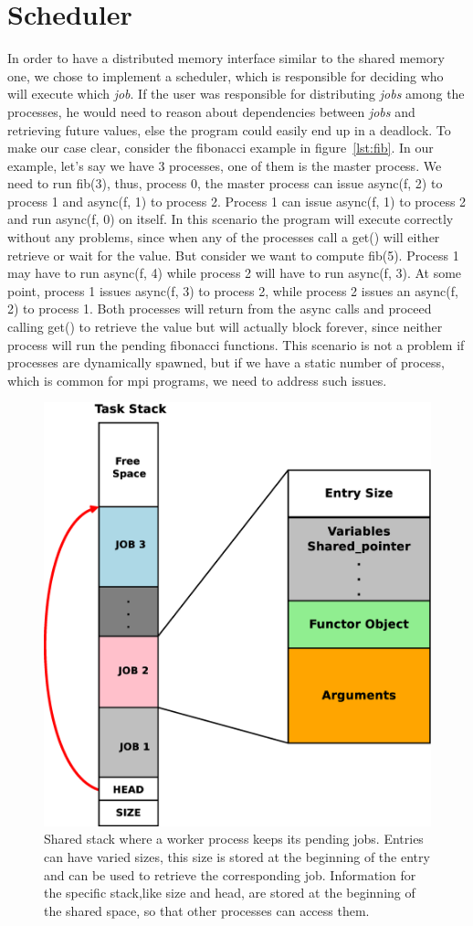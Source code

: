 \section{Scheduler}
\label{sect:scheduler}
In order to have a distributed memory interface similar to the shared memory one, we chose to implement 
a scheduler, which is responsible for deciding who will execute which \emph{job}.  If the user was 
responsible for distributing \emph{jobs} among the processes,  he would need to reason about dependencies
between \emph{jobs} and retrieving future values, else the program could easily end up in a deadlock.
To make our case clear, consider the fibonacci example in figure~\ref{lst:fib}.  
In our example, let's say we have
3 processes, one of them is the master process.  We need to run fib(3), thus, process 0, the master process 
can issue async(f, 2) to process 1 and async(f, 1) to process 2.  Process 1 can issue async(f, 1) to 
process 2 and run async(f, 0) on itself.  In this scenario the program will execute correctly without any
problems, since when any of the processes call a get() will either retrieve or wait for the value.  But 
consider we want to compute fib(5).  Process 1 may have to run async(f, 4) while process 2 will have to run
async(f, 3).  At some point, process 1 issues async(f, 3) to process 2, while process 2 issues an async(f, 2)
to process 1.  Both processes will return from the async calls and proceed calling get() to retrieve the value
but will actually block forever, since neither process will run the pending fibonacci functions.  This scenario
is not a problem if processes are dynamically spawned, but if we have a static number of process, which is
common for mpi programs, we need to address such issues.  

\begin{figure}[!ht]
\center
\includegraphics[width=0.5\columnwidth]{figures/task_stack}
\caption{Shared stack where a worker process keeps its pending jobs.  Entries can have varied sizes, this
size is stored at the beginning of the entry and can be used to retrieve the corresponding job.  Information
for the specific stack,like size and head, are stored at the beginning of the shared space, so that other
processes can access them.}
\label{fig:task_stack}
\end{figure}

